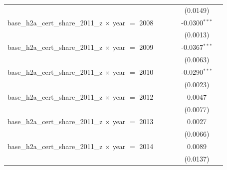 \begin{tabular}{lccccc}
                                                                &                    &                 &                       & (0.0149)                   &   \\   
   base\_h2a\_cert\_share\_2011\_z $\times$ year $=$ 2008       &                    &                 &                       & -0.0300$^{***}$            &   \\   
                                                                &                    &                 &                       & (0.0013)                   &   \\   
   base\_h2a\_cert\_share\_2011\_z $\times$ year $=$ 2009       &                    &                 &                       & -0.0367$^{***}$            &   \\   
                                                                &                    &                 &                       & (0.0063)                   &   \\   
   base\_h2a\_cert\_share\_2011\_z $\times$ year $=$ 2010       &                    &                 &                       & -0.0290$^{***}$            &   \\   
                                                                &                    &                 &                       & (0.0023)                   &   \\   
   base\_h2a\_cert\_share\_2011\_z $\times$ year $=$ 2012       &                    &                 &                       & 0.0047                     &   \\   
                                                                &                    &                 &                       & (0.0077)                   &   \\   
   base\_h2a\_cert\_share\_2011\_z $\times$ year $=$ 2013       &                    &                 &                       & 0.0027                     &   \\   
                                                                &                    &                 &                       & (0.0066)                   &   \\   
   base\_h2a\_cert\_share\_2011\_z $\times$ year $=$ 2014       &                    &                 &                       & 0.0089                     &   \\   
                                                                &                    &                 &                       & (0.0137)                   &   \\   

\end{tabular}

